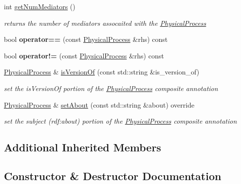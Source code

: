 \begin{DoxyCompactItemize}
int \hyperlink{classomexmeta_1_1PhysicalProcess_a717a352ce3bb956201174002f904cd26}{get\+Num\+Mediators} ()
\begin{DoxyCompactList}\small\item\em returns the number of mediators assocaited with the \hyperlink{classomexmeta_1_1PhysicalProcess}{Physical\+Process} \end{DoxyCompactList}\item 
\mbox{\label{classomexmeta_1_1PhysicalProcess_a65585bf5cd473d509f6f66c96757ff8d}} 
bool {\bfseries operator==} (const \hyperlink{classomexmeta_1_1PhysicalProcess}{Physical\+Process} \&rhs) const
\item 
\mbox{\label{classomexmeta_1_1PhysicalProcess_af8298394b713807ec51c2b5f60afd00e}} 
bool {\bfseries operator!=} (const \hyperlink{classomexmeta_1_1PhysicalProcess}{Physical\+Process} \&rhs) const
\item 
\hyperlink{classomexmeta_1_1PhysicalProcess}{Physical\+Process} \& \hyperlink{classomexmeta_1_1PhysicalProcess_a52ff2832ac567a4cee2043d37ddcbc6b}{is\+Version\+Of} (const std\+::string \&is\+\_\+version\+\_\+of)
\begin{DoxyCompactList}\small\item\em set the is\+Version\+Of portion of the \hyperlink{classomexmeta_1_1PhysicalProcess}{Physical\+Process} composite annotation \end{DoxyCompactList}\item 
\hyperlink{classomexmeta_1_1PhysicalProcess}{Physical\+Process} \& \hyperlink{classomexmeta_1_1PhysicalProcess_a6aacc0d7277768fc7a146b46b8606d97}{set\+About} (const std\+::string \&about) override
\begin{DoxyCompactList}\small\item\em set the subject (rdf\+:about) portion of the \hyperlink{classomexmeta_1_1PhysicalProcess}{Physical\+Process} composite annotation \end{DoxyCompactList}\end{DoxyCompactItemize}
\subsection*{Additional Inherited Members}


\subsection{Constructor \& Destructor Documentation}
\mbox{\label{classomexmeta_1_1PhysicalProcess_acf4c42d10d6dbdd3aa4285bed7bd823b}} 
